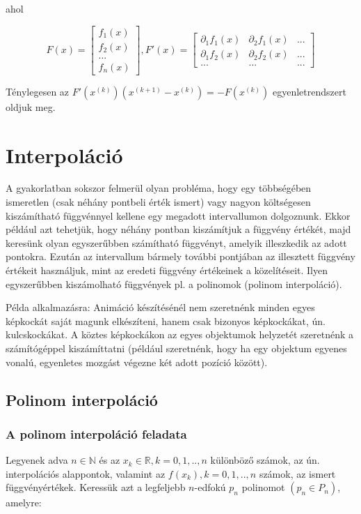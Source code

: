 \documentclass[margin=0px]{article}
\begin{document}
	\noindent ahol
	
	\begin{displaymath}
		F(x) = \begin{bmatrix}
		f_{1}(x) \\[0.3em]
		f_{2}(x) \\[0.3em]
		...  \\[0.3em]
		f_{n}(x)
		\end{bmatrix},
		F'(x) = \begin{bmatrix}
		\partial_{1}f_{1}(x) & \partial_{2}f_{1}(x)& ... \\[0.3em]
		\partial_{1}f_{2}(x) & \partial_{2}f_{2}(x)& ... \\[0.3em]
		... & ... & ...
		\end{bmatrix}
	\end{displaymath}
	
	\noindent Ténylegesen az $F'(x^{(k)}) (x^{(k+1)} - x^{(k)}) = -F(x^{(k)})$ egyenletrendszert oldjuk meg.
	
	\section{Interpoláció}
	
	A gyakorlatban sokszor felmerül olyan probléma, hogy egy többségében ismeretlen (csak néhány pontbeli érték ismert) 
	vagy nagyon költségesen kiszámítható függvénnyel kellene egy megadott intervallumon dolgoznunk.
	Ekkor például azt tehetjük, hogy néhány pontban kiszámítjuk	a függvény értékét, 
	majd keresünk olyan egyszerűbben számítható függvényt, amelyik illeszkedik az
	adott pontokra. Ezután az intervallum bármely további pontjában az illesztett függvény értékeit használjuk, mint
	az eredeti függvény értékeinek a közelítéseit. Ilyen egyszerűbben kiszámolható függvények pl. a polinomok (polinom interpoláció).
	
	Példa alkalmazásra: Animáció készítésénél nem szeretnénk minden egyes képkockát saját magunk elkészíteni, hanem csak bizonyos képkockákat,
	ún. kulcskockákat. A köztes képkockákon az egyes objektumok helyzetét szeretnénk a számítógéppel kiszámíttatni (például szeretnénk, hogy
	ha egy objektum egyenes vonalú, egyenletes mozgást végezne két adott pozíció között).
	
	\subsection{Polinom interpoláció}
	
	\subsubsection{A polinom interpoláció feladata}
	Legyenek adva $n \in \mathbb{N}$ és az $x_{k} \in \mathbb{R}, k=0,1,..,n$ különböző számok, az ún. interpolációs alappontok, valamint
	az $f(x_{k}),k=0,1,..,n$ számok, az ismert függvényértékek. Keressük azt a legfeljebb $n$-edfokú $p_{n}$ polinomot $(p_{n} \in P_{n})$,
	amelyre:
	
\end{document}
